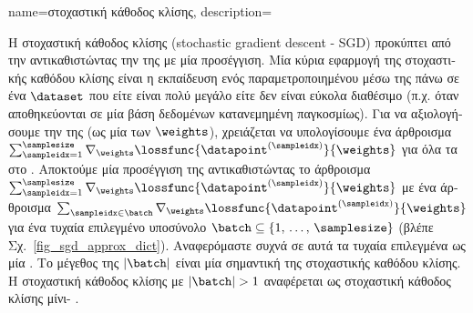 {name={\foreignlanguage{greek}{στοχαστική κάθοδος κλίσης}}, 
	description={\foreignlanguage{greek}{Η στοχαστική κάθοδος κλίσης} 
		(stochastic gradient descent - SGD) \foreignlanguage{greek}{προκύπτει από την}  
		\foreignlanguage{greek}{αντικαθιστώντας την}  \foreignlanguage{greek}{της}  
		\foreignlanguage{greek}{με μία}  \foreignlanguage{greek}{προσέγγιση. Μία κύρια εφαρμογή της
		στοχαστικής καθόδου κλίσης είναι η εκπαίδευση ενός παραμετροποιημένου}  \foreignlanguage{greek}{μέσω
		της}  \foreignlanguage{greek}{πάνω σε ένα}  $\dataset$ \foreignlanguage{greek}{που  
		είτε είναι πολύ μεγάλο είτε δεν είναι εύκολα διαθέσιμο (π.χ. όταν}  \foreignlanguage{greek}{αποθηκεύονται 
		σε μία βάση δεδομένων κατανεμημένη παγκοσμίως). Για να αξιολογήσουμε την}  
		\foreignlanguage{greek}{της}  (\foreignlanguage{greek}{ως μία}  \foreignlanguage{greek}{των} 
		 $\weights$), \foreignlanguage{greek}{χρειάζεται να υπολογίσουμε ένα άρθροισμα
		$\sum_{\sampleidx=1}^{\samplesize} \nabla_{\weights} \lossfunc{\datapoint^{(\sampleidx)}}{\weights}$ για όλα τα}  
		\foreignlanguage{greek}{στο} . \foreignlanguage{greek}{Αποκτούμε μία}  
		\foreignlanguage{greek}{προσέγγιση της}  \foreignlanguage{greek}{αντικαθιστώντας το άρθροισμα  
		$\sum_{\sampleidx=1}^{\samplesize} \nabla_{\weights} \lossfunc{\datapoint^{(\sampleidx)}}{\weights}$ 
		με ένα άρθροισμα $\sum_{\sampleidx \in \batch} \nabla_{\weights} \lossfunc{\datapoint^{(\sampleidx)}}{\weights}$ 
		για ένα τυχαία επιλεγμένο υποσύνολο $\batch \subseteq \{1, \,\ldots, \,\samplesize\}$ (βλέπε Σχ.}\ \ref{fig_sgd_approx_dict}). 
		\foreignlanguage{greek}{Αναφερόμαστε συχνά σε αυτά τα τυχαία επιλεγμένα}  \foreignlanguage{greek}{ως 
		μία} . \foreignlanguage{greek}{Το μέγεθος της}  $|\batch|$ \foreignlanguage{greek}{είναι μία 
		σημαντική}  \foreignlanguage{greek}{της στοχαστικής καθόδου κλίσης. Η στοχαστική κάθοδος κλίσης  
		με $|\batch|> 1$ αναφέρεται ως στοχαστική κάθοδος κλίσης μίνι}- \cite{Bottou99}. 		
		\begin{figure}[H]

\end{figure}}}
